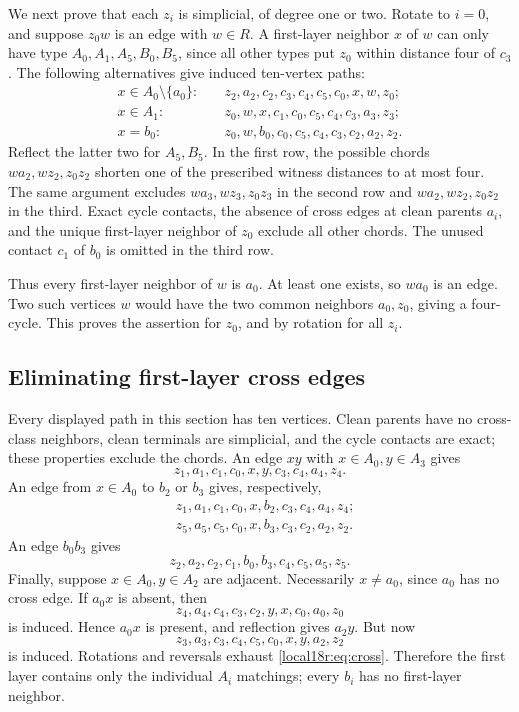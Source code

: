 \documentclass[11pt,a4paper]{article}
\theoremstyle{definition}\newtheorem{definition}[theorem]{Definition}
\theoremstyle{remark}\newtheorem{remark}[theorem]{Remark}
\begin{document}
We next prove that each $z_i$ is simplicial, of degree one or two.
Rotate to $i=0$, and suppose $z_0w$ is an edge with $w\in R$. A
first-layer neighbor $x$ of $w$ can only have type
$A_0,A_1,A_5,B_0,B_5$, since all other types put $z_0$ within distance
four of $c_3$. The following alternatives give induced ten-vertex paths:
\begin{align*}
 x\in A_0\setminus\{a_0\}:&\quad
 z_2,a_2,c_2,c_3,c_4,c_5,c_0,x,w,z_0;\\
 x\in A_1:&\quad
 z_0,w,x,c_1,c_0,c_5,c_4,c_3,a_3,z_3;\\
 x=b_0:&\quad
 z_0,w,b_0,c_0,c_5,c_4,c_3,c_2,a_2,z_2.
\end{align*}
Reflect the latter two for $A_5,B_5$. In the first row, the possible
chords $wa_2,wz_2,z_0z_2$ shorten one of the prescribed witness distances
to at most four. The same argument excludes $wa_3,wz_3,z_0z_3$ in the
second row and $wa_2,wz_2,z_0z_2$ in the third. Exact cycle contacts,
the absence of cross edges at clean parents $a_i$, and the unique
first-layer neighbor of $z_0$ exclude all other chords. The unused
contact $c_1$ of $b_0$ is omitted in the third row.

Thus every first-layer neighbor of $w$ is $a_0$. At least one exists,
so $wa_0$ is an edge. Two such vertices $w$ would have the two common
neighbors $a_0,z_0$, giving a four-cycle. This proves the assertion for
$z_0$, and by rotation for all $z_i$.

\subsection{Eliminating first-layer cross edges}
Every displayed path in this section has ten vertices. Clean parents
have no cross-class neighbors, clean terminals are simplicial, and the
cycle contacts are exact; these properties exclude the chords.
An edge $xy$ with $x\in A_0,y\in A_3$ gives
\[
 z_1,a_1,c_1,c_0,x,y,c_3,c_4,a_4,z_4.
\]
An edge from $x\in A_0$ to $b_2$ or $b_3$ gives, respectively,
\begin{align*}
 &z_1,a_1,c_1,c_0,x,b_2,c_3,c_4,a_4,z_4;\\
 &z_5,a_5,c_5,c_0,x,b_3,c_3,c_2,a_2,z_2.
\end{align*}
An edge $b_0b_3$ gives
\[
 z_2,a_2,c_2,c_1,b_0,b_3,c_4,c_5,a_5,z_5.
\]
Finally, suppose $x\in A_0,y\in A_2$ are adjacent. Necessarily
$x\ne a_0$, since $a_0$ has no cross edge. If $a_0x$ is absent, then
\[
 z_4,a_4,c_4,c_3,c_2,y,x,c_0,a_0,z_0
\]
is induced. Hence $a_0x$ is present, and reflection gives $a_2y$.
But now
\[
 z_3,a_3,c_3,c_4,c_5,c_0,x,y,a_2,z_2
\]
is induced. Rotations and reversals exhaust \eqref{local18r:eq:cross}.
Therefore the first layer contains only the individual $A_i$ matchings;
every $b_i$ has no first-layer neighbor.
\end{document}
